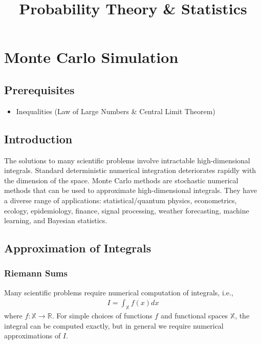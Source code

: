 \documentclass[11pt,a4paper]{article}
\title{Probability Theory \& Statistics}
\begin{document}
\maketitle
\newpage

\section{Monte Carlo Simulation}

\subsection{Prerequisites}

\begin{itemize}
\item
Inequalities (Law of Large Numbers \& Central Limit Theorem)
\end{itemize}

\subsection{Introduction}

The solutions to many scientific problems involve intractable
high-dimensional integrals. 
Standard deterministic numerical integration
deteriorates rapidly with the dimension of the space. 
Monte Carlo methods are stochastic numerical methods that 
can be used to approximate high-dimensional integrals. 
They have a diverse range of applications:
statistical/quantum physics, econometrics, ecology, epidemiology,
finance, signal processing, weather forecasting, machine learning, and
Bayesian statistics.

\subsection{Approximation of Integrals}

\subsubsection{Riemann Sums}
Many scientific problems require numerical computation of
integrals, i.e.,
\begin{align}
I = \int_{\mathbb{X}}^{}{f(x)}dx
\end{align}
where \(f:\mathbb{X} \rightarrow \mathbb{R}\). 
For simple choices of functions \(f\) and functional spaces \(\mathbb{X}\), 
the integral can be computed exactly, 
but in general we require numerical approximations of \(I\).
\end{document}
